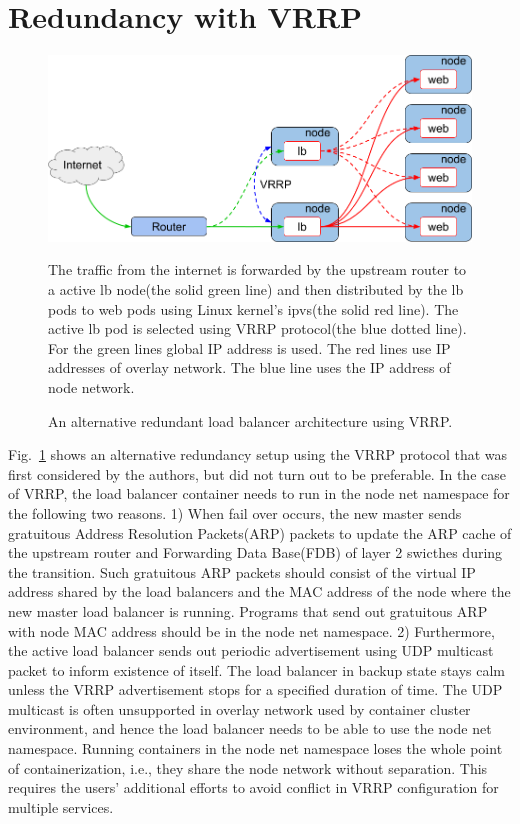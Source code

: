 
\appendix

\section{Redundancy with VRRP}\label{Redundancy with VRRP}

\begin{figure}[h]
\begin{center}
\includegraphics[width=\columnwidth]{Figs/vrrp.png}
\end{center}
\caption{ An alternative redundant load balancer architecture using VRRP.}
  The traffic from the internet is forwarded by the upstream router to a active lb node(the solid green line) and then distributed by the lb pods to web pods using Linux kernel's ipvs(the solid red line).
  The active lb pod is selected using VRRP protocol(the blue dotted line).
  For the green lines global IP address is used. The red lines use IP addresses of overlay network. The blue line uses the IP address of node network.

\label{fig:vrrp}
\end{figure}

Fig.~\ref{fig:vrrp} shows an alternative redundancy setup using the VRRP protocol that was first considered by the authors, but did not turn out to be preferable.
In the case of VRRP, the load balancer container needs to run in the node net namespace for the following two reasons.
1) When fail over occurs, the new master sends gratuitous Address Resolution Packets(ARP) packets to update the ARP cache of the upstream router and Forwarding Data Base(FDB) of layer 2 swicthes during the transition.
Such gratuitous ARP packets should consist of the virtual IP address shared by the load balancers and the MAC address of the node where the new master load balancer is running.
Programs that send out gratuitous ARP with node MAC address should be in the node net namespace.
%
2) Furthermore, the active load balancer sends out periodic advertisement using UDP multicast packet to inform existence of itself.
The load balancer in backup state stays calm unless the VRRP advertisement stops for a specified duration of time.
The UDP multicast is often unsupported in overlay network used by container cluster environment, and hence the load balancer needs to be able to use the node net namespace.
%
Running containers in the node net namespace loses the whole point of containerization, i.e., they share the node network without separation.
This requires the users' additional efforts to avoid conflict in VRRP configuration for multiple services.
%

